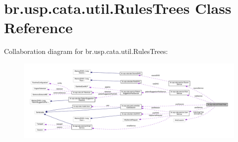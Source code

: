 \hypertarget{classbr_1_1usp_1_1cata_1_1util_1_1_rules_trees}{\section{br.\+usp.\+cata.\+util.\+Rules\+Trees Class Reference}
\label{classbr_1_1usp_1_1cata_1_1util_1_1_rules_trees}
}


Collaboration diagram for br.\+usp.\+cata.\+util.\+Rules\+Trees\+:\nopagebreak
\begin{figure}[H]
\begin{center}
\leavevmode
\includegraphics[width=350pt]{classbr_1_1usp_1_1cata_1_1util_1_1_rules_trees__coll__graph}
\end{center}
\end{figure}
